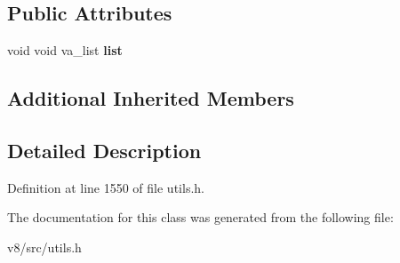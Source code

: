 \subsection*{Public Attributes}
\begin{DoxyCompactItemize}
\item 
\mbox{\label{classv8_1_1internal_1_1StringBuilder_a5d0a95066ae5f8c2469e4123d900548c}} 
void void va\+\_\+list {\bfseries list}
\end{DoxyCompactItemize}
\subsection*{Additional Inherited Members}


\subsection{Detailed Description}


Definition at line 1550 of file utils.\+h.



The documentation for this class was generated from the following file\+:\begin{DoxyCompactItemize}
\item 
v8/src/utils.\+h\end{DoxyCompactItemize}
